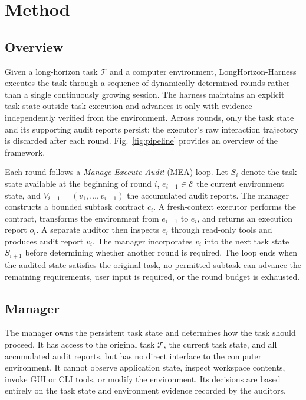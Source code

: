 \section{Method}

\subsection{Overview}
\label{sec:method:overview}

Given a long-horizon task $\mathcal{T}$ and a computer environment,
LongHorizon-Harness executes the task through a sequence of dynamically
determined rounds rather than a single continuously growing session.
The harness maintains an explicit task state outside task execution and
advances it only with evidence independently verified from the
environment. Across rounds, only the task state and its supporting audit
reports persist; the executor's raw interaction trajectory is
discarded after each round. Fig.~\ref{fig:pipeline} provides an overview
of the framework.

Each round follows a \emph{Manage-Execute-Audit} (MEA) loop. Let $S_i$
denote the task state available at the beginning of round $i$,
$e_{i-1}\in\mathcal{E}$ the current environment state, and
$V_{i-1}=(v_1,\ldots,v_{i-1})$ the accumulated audit reports. The
manager constructs a bounded subtask contract $c_i$. A fresh-context
executor performs the contract, transforms the environment from
$e_{i-1}$ to $e_i$, and returns an execution report $o_i$. A separate
auditor then inspects $e_i$ through read-only tools and produces audit
report $v_i$. The manager incorporates $v_i$ into the next task state
$S_{i+1}$ before determining whether another round is required. The loop
ends when the audited state satisfies the original task, no
permitted subtask can advance the remaining requirements, user input is
required, or the round budget is exhausted.


\subsection{Manager}
\label{sec:method:manager}

The manager owns the persistent task state and determines how the task
should proceed. It has access to the original task $\mathcal{T}$, the
current task state, and all accumulated audit reports, but has no direct
interface to the computer environment. It cannot observe application
state, inspect workspace contents, invoke GUI or CLI tools, or modify
the environment. Its decisions are based entirely on the task state and
environment evidence recorded by the auditors.

